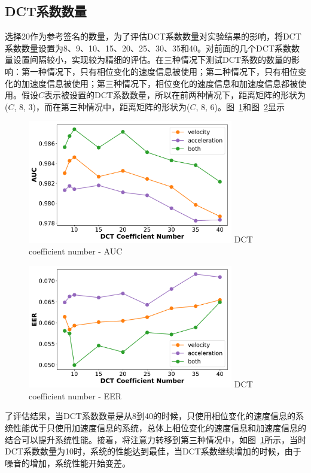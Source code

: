 \subsection{DCT系数数量}
选择20作为参考签名的数量，为了评估DCT系数数量对实验结果的影响，将DCT系数数量设置为8、9、10、15、20、25、30、35和40。对前面的几个DCT系数数量设置间隔较小，实现较为精细的评估。在三种情况下测试DCT系数的数量的影响：第一种情况下，只有相位变化的速度信息被使用；第二种情况下，只有相位变化的加速度信息被使用；第三种情况下，相位变化的速度信息和加速度信息都被使用。假设$C$表示被设置的DCT系数数量，所以在前两种情况下，距离矩阵的形状为($C$, 8, 3)，而在第三种情况中，距离矩阵的形状为($C$, 8, 6)。图~\ref{fig:dct-total-auc}和图~\ref{fig:dct-total-eer}显示
\begin{figure}[!htp]
  \centering
  \includegraphics[width=0.8\textwidth]{figure/dct_total_auc.pdf}
      {DCT coefficient number - AUC}
  \label{fig:dct-total-auc}
\end{figure}
\begin{figure}[!htp]
  \centering
  \includegraphics[width=0.8\textwidth]{figure/dct_total_eer.pdf}
      {DCT coefficient number - EER}
  \label{fig:dct-total-eer}
\end{figure}
了评估结果，当DCT系数数量是从8到40的时候，只使用相位变化的速度信息的系统性能优于只使用加速度信息的系统，总体上相位变化的速度信息和加速度信息的结合可以提升系统性能。接着，将注意力转移到第三种情况中，如图~\ref{fig:dct-total-auc}所示，当时DCT系数数量为10时，系统的性能达到最佳，当DCT系数继续增加的时候，由于噪音的增加，系统性能开始变差。

